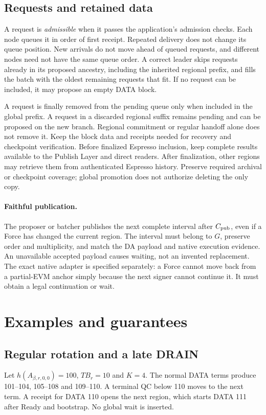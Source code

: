 \documentclass[11pt,a4paper]{article}
\newcommand{\TB}{\mathit{TB}}
\newcommand{\defterm}[1]{\textcolor{rrBlue}{\textit{#1}}}
\begin{document}
\subsection{Requests and retained data}
\label{sec:requests}
A request is \defterm{admissible} when it passes the application's admission
checks. Each node queues it in order of first receipt. Repeated delivery
does not change its queue position. New arrivals do not move
ahead of queued requests, and different nodes need not have the same
queue order. A correct leader skips requests
already in its proposed ancestry, including the inherited regional
prefix, and fills the batch with the oldest remaining requests that fit.
If no request can be included, it may propose an empty DATA block.

A request is finally removed from the pending queue only when included
in the global prefix. A request in a discarded regional suffix remains
pending and can be proposed on the new branch. Regional commitment or
regular handoff alone does not remove it. Keep the block data and
receipts needed for recovery and checkpoint verification. Before finalized Espresso
inclusion, keep complete results available to the Publish Layer and
direct readers. After finalization, other regions may retrieve them from
authenticated Espresso history. Preserve required archival or checkpoint
coverage; global promotion does not authorize deleting the only copy.



\paragraph{Faithful publication.}
The proposer or batcher publishes the next complete interval after
$C_{\rm pub}$, even if a Force has changed the current region.
The interval must belong to $G$, preserve order and multiplicity, and
match the DA payload and native execution evidence. An unavailable
accepted payload causes waiting, not an invented replacement.
The exact native adapter is specified separately: a Force cannot move
back from a partial-EVM anchor simply because the next signer cannot
continue it. It must obtain a legal continuation or wait.

\section{Examples and guarantees}
\label{sec:examples}
\subsection{Regular rotation and a late DRAIN}
\label{sec:regular-example}
Let $h(A_{\beta,r,0,0})=100$, $\TB_r=10$ and $K=4$. The normal DATA terms
produce 101--104, 105--108 and 109--110. A terminal QC below 110 moves
to the next term. A receipt for DATA 110 opens the next region, which
starts DATA 111 after Ready and bootstrap. No global wait is inserted.
\end{document}
